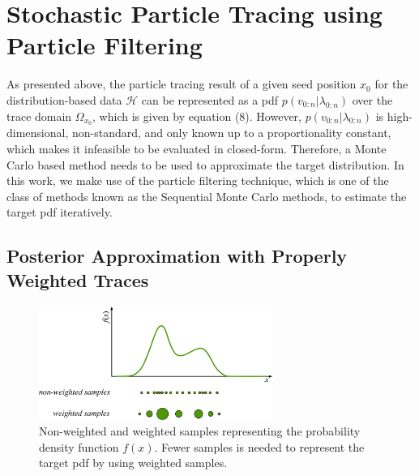 \section{Stochastic Particle Tracing using Particle Filtering}

As presented above, the particle tracing result of a given seed position $x_0$ for the distribution-based data $\mathcal{H}$ can be represented as a pdf $p({v_{0:n}}|{\lambda_{0:n}})$ over the trace domain $\Omega_{x_0}$, which is given by equation (8). However, $p({v_{0:n}}|{\lambda_{0:n}})$ is high-dimensional, non-standard, and only known up to a proportionality constant, which makes it infeasible to be evaluated in closed-form. Therefore, a Monte Carlo based method needs to be used to approximate the target distribution. In this work, we make use of the particle filtering technique, which is one of the class of methods known as the Sequential Monte Carlo methods, to estimate the target pdf iteratively.

\subsection{Posterior Approximation with Properly Weighted Traces}

\begin{figure}[htb]
  \centering
  \includegraphics[width=3in]{../figures/importance_sampling.eps}
  \caption{Non-weighted and weighted samples representing the probability density function $f(x)$. Fewer samples is needed to represent the target pdf by using weighted samples.}
  \label{importance_sampling}
\end{figure}

